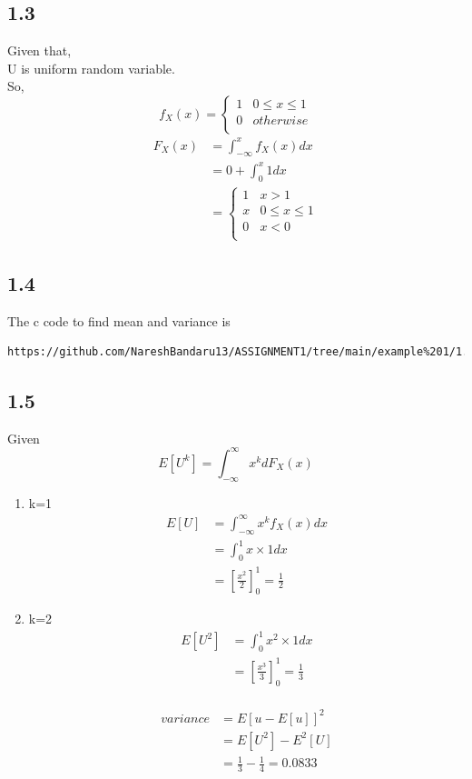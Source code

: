 \documentclass[journal,12pt,twocolumn]{IEEEtran}
\begin{document}
\subsection*{1.3}
Given that,\\
 U is uniform random variable.\\
So,\\
\[
  f_X (x) =
 \begin{cases}
 1  & 0 \le x \le 1 \\
 0  & otherwise \\
 \end{cases}
\]
\begin{align*}
    F_X (x) &= \int_{-\infty} ^{x} f_X (x) dx \\
          &= 0 + \int_{0} ^{x} 1 dx \\
          &= 
\begin{cases}
 1 & x >1 \\
 x & 0 \le x \le 1 \\
 0  & x<0 \\
 \end{cases}
\end{align*}

\subsection*{1.4}
The c code to find mean and variance is
\begin{lstlisting}
https://github.com/NareshBandaru13/ASSIGNMENT1/tree/main/example%201/1.4
\end{lstlisting}
\subsection*{1.5}
Given
$$E[U^{k}] = \int_{-\infty} ^{\infty} x^{k}dF_X (x)$$
\begin{enumerate}
    \item k=1 
     \begin{align*}
        E[U] &= \int_{-\infty} ^{\infty} x^{k}f_X (x) dx \\
           &= \int_{0} ^{1} x \times 1 dx \\
           &= \left[\frac{x^2}{2}\right]_{0} ^{1} = \frac{1}{2}
     \end{align*} 
     \item k=2 
       \begin{align*}
          E[U^2] &= \int_{0} ^{1} x^{2}\times 1 dx \\
          &= \left[\frac{x^3}{3}\right]_{0} ^{1} = \frac{1}{3}
      \end{align*}\\
      \begin{align*}
    variance &= E[u-E[u]]^{2} \\
    &= E[U^{2}]-E^{2}[U] \\
    &= \frac{1}{3} - \frac{1}{4} = 0.0833 \\
\end{align*}
\end{enumerate}
\end{document}
